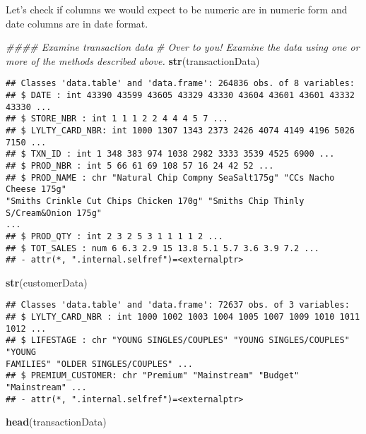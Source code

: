 \documentclass[]{article}
\newenvironment{Shaded}{\begin{snugshade}}{\end{snugshade}}
\newcommand{\CommentTok}[1]{\textcolor[rgb]{0.56,0.35,0.01}{\textit{#1}}}
\newcommand{\KeywordTok}[1]{\textcolor[rgb]{0.13,0.29,0.53}{\textbf{#1}}}
\newcommand{\NormalTok}[1]{#1}
\begin{document}
Let's check if columns we would expect to be numeric are in numeric form
and date columns are in date format.

\begin{Shaded}
\begin{Highlighting}[]
\CommentTok{#### Examine transaction data}
\CommentTok{# Over to you! Examine the data using one or more of the methods described above.}
\KeywordTok{str}\NormalTok{(transactionData)}
\end{Highlighting}
\end{Shaded}

\begin{verbatim}
## Classes 'data.table' and 'data.frame': 264836 obs. of 8 variables:
## $ DATE : int 43390 43599 43605 43329 43330 43604 43601 43601 43332 43330 ...
## $ STORE_NBR : int 1 1 1 2 2 4 4 4 5 7 ...
## $ LYLTY_CARD_NBR: int 1000 1307 1343 2373 2426 4074 4149 4196 5026 7150 ...
## $ TXN_ID : int 1 348 383 974 1038 2982 3333 3539 4525 6900 ...
## $ PROD_NBR : int 5 66 61 69 108 57 16 24 42 52 ...
## $ PROD_NAME : chr "Natural Chip Compny SeaSalt175g" "CCs Nacho Cheese 175g"
"Smiths Crinkle Cut Chips Chicken 170g" "Smiths Chip Thinly S/Cream&Onion 175g"
...
## $ PROD_QTY : int 2 3 2 5 3 1 1 1 1 2 ...
## $ TOT_SALES : num 6 6.3 2.9 15 13.8 5.1 5.7 3.6 3.9 7.2 ...
## - attr(*, ".internal.selfref")=<externalptr>
\end{verbatim}

\begin{Shaded}
\begin{Highlighting}[]
\KeywordTok{str}\NormalTok{(customerData)}
\end{Highlighting}
\end{Shaded}

\begin{verbatim}
## Classes 'data.table' and 'data.frame': 72637 obs. of 3 variables:
## $ LYLTY_CARD_NBR : int 1000 1002 1003 1004 1005 1007 1009 1010 1011 1012 ...
## $ LIFESTAGE : chr "YOUNG SINGLES/COUPLES" "YOUNG SINGLES/COUPLES" "YOUNG
FAMILIES" "OLDER SINGLES/COUPLES" ...
## $ PREMIUM_CUSTOMER: chr "Premium" "Mainstream" "Budget" "Mainstream" ...
## - attr(*, ".internal.selfref")=<externalptr>
\end{verbatim}

\begin{Shaded}
\begin{Highlighting}[]
\KeywordTok{head}\NormalTok{(transactionData)}
\end{Highlighting}
\end{Shaded}
\end{document}
